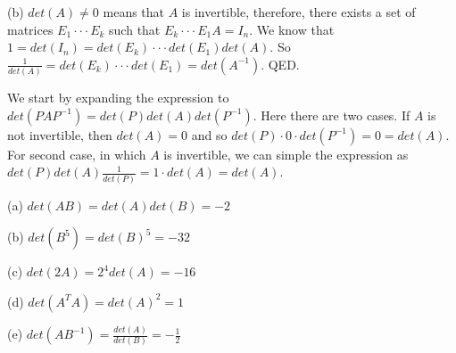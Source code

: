 \documentclass[11pt]{article} %
\begin{document}
(b) $det(A) \neq 0$ means that $A$ is invertible, therefore, there exists a set of matrices $E_1 \cdot\cdot\cdot E_k$ such that $E_k \cdot\cdot\cdot E_1 A = I_n$. We know that $1 = det(I_n) = det(E_k) \cdot \cdot \cdot det(E_1) det(A)$. So $\frac{1}{det(A)} = det(E_k) \cdot \cdot \cdot det(E_1) = det(A^{-1})$. QED.

\medskip
{}
We start by expanding the expression to $det(PAP^{-1}) = det(P)det(A)det(P^{-1})$. Here there are two cases. If $A$ is not invertible, then $det(A) = 0$ and so $det(P) \cdot 0 \cdot det(P^{-1}) = 0 = det(A)$. For second case, in which $A$ is invertible, we can simple the expression as $det(P)det(A)\frac{1}{det(P)} = 1\cdot det(A) = det(A)$.

\medskip
{}

(a) $det(AB) = det(A)det(B) = -2$

(b) $det(B^5) = det(B)^5 = -32$

(c) $det(2A) = 2^4det(A) = -16$

(d) $det(A^TA) = det(A)^2 = 1$

(e) $det(AB^{-1}) = \frac{det(A)}{det(B)} = -\frac{1}{2}$
\end{document}
